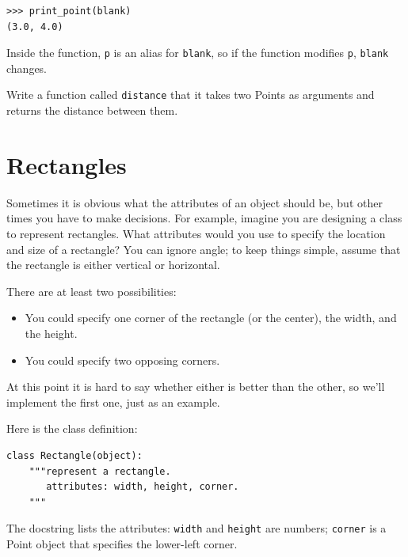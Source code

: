 \documentclass[10pt]{book}
\begin{document}
\beforeverb
\begin{verbatim}
>>> print_point(blank)
(3.0, 4.0)
\end{verbatim}
\afterverb
%
Inside the function, {\tt p} is an alias for {\tt blank}, so if
the function modifies {\tt p}, {\tt blank} changes.



\begin{ex}
Write a function called {\tt distance} that it takes two Points
as arguments and returns the distance between them.
\end{ex}



\section{Rectangles}

Sometimes it is obvious what the attributes of an object should be,
but other times you have to make decisions.  For example, imagine you
are designing a class to represent rectangles.  What attributes would
you use to specify the location and size of a rectangle?  You can
ignore angle; to keep things simple, assume that the rectangle is
either vertical or horizontal.


There are at least two possibilities: 

\begin{itemize}

\item You could specify one corner of the rectangle
(or the center), the width, and the height.

\item You could specify two opposing corners.

\end{itemize}

At this point it is hard to say whether either is better than
the other, so we'll implement the first one, just as an example.


Here is the class definition:

\beforeverb
\begin{verbatim}
class Rectangle(object):
    """represent a rectangle. 
       attributes: width, height, corner.
    """
\end{verbatim}
\afterverb
%
The docstring lists the attributes:  {\tt width} and
{\tt height} are numbers; {\tt corner} is a Point object that
specifies the lower-left corner.
\end{document}
